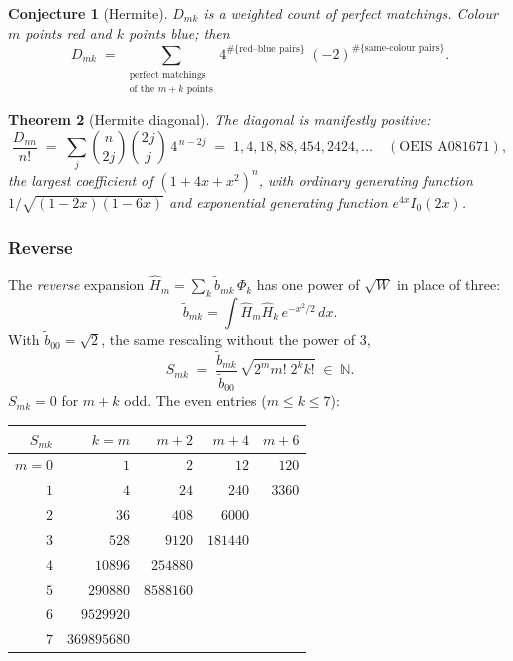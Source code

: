 \documentclass[11pt,a4paper]{article}
\newtheorem{theorem}{Theorem}[section]
\newtheorem{conjecture}[theorem]{Conjecture}
\theoremstyle{definition}
\newcommand{\N}{\mathbb{N}}
\begin{document}
\begin{tcolorbox}[colback=black!5, colframe=black!5, boxrule=0pt, sharp corners]
\begin{conjecture}[Hermite]\label{thm:hermite}
$D_{mk}$ is a weighted count of perfect matchings. Colour $m$ points
red and $k$ points blue; then
\[
  D_{mk} \;=\; \sum_{\substack{\text{perfect matchings}\\
  \text{of the } m+k \text{ points}}}
  4^{\#\{\text{red--blue pairs}\}} \; (-2)^{\#\{\text{same-colour pairs}\}} .
\]
\end{conjecture}
\end{tcolorbox}

\begin{tcolorbox}[colback=black!5, colframe=black!5, boxrule=0pt, sharp corners]
\begin{theorem}[Hermite diagonal]\label{thm:hermite-diag}
The diagonal is manifestly positive:
\[
  \frac{D_{nn}}{n!}
  \;=\; \sum_{j} \binom{n}{2j} \binom{2j}{j}\, 4^{\,n-2j}
  \;=\; 1, 4, 18, 88, 454, 2424, \ldots \quad (\text{OEIS A081671}),
\]
the largest coefficient of $(1 + 4x + x^2)^n$, with ordinary
generating function $1/\sqrt{(1-2x)(1-6x)}$ and exponential
generating function $e^{4x} I_0(2x)$.
\end{theorem}
\end{tcolorbox}


\subsubsection*{Reverse}

The \emph{reverse} expansion $\widehat H_m = \sum_k \widetilde b_{mk}\, \Phi_k$
has one power of $\sqrt W$ in place of three:
\[
  \widetilde b_{mk} = \int \widehat H_m \widehat H_k\, e^{-x^2/2}\, dx .
\]
With $\widetilde b_{00} = \sqrt2$, the same rescaling without the
power of $3$,
\[
  S_{mk} \;=\; \frac{\widetilde b_{mk}}{\widetilde b_{00}}\,
  \sqrt{2^m m!\; 2^k k!} \;\in\; \N .
\]
$S_{mk} = 0$ for $m+k$ odd. The even entries ($m \le k \le 7$):

\begin{tcolorbox}[colback=black!5, colframe=black!5, boxrule=0pt, sharp corners]
\begin{center}
\begin{tabular}{r|rrrr}
$S_{mk}$ & $k=m$ & $m{+}2$ & $m{+}4$ & $m{+}6$ \\
\hline
$m=0$ & $1$      & $2$      & $12$      & $120$ \\
$1$   & $4$      & $24$     & $240$     & $3360$ \\
$2$   & $36$     & $408$    & $6000$    &  \\
$3$   & $528$    & $9120$   & $181440$  &  \\
$4$   & $10896$  & $254880$ &           &  \\
$5$   & $290880$ & $8588160$&           &  \\
$6$   & $9529920$&           &           &  \\
$7$   & $369895680$ &        &           &  \\
\end{tabular}
\end{center}
\end{tcolorbox}
\end{document}
